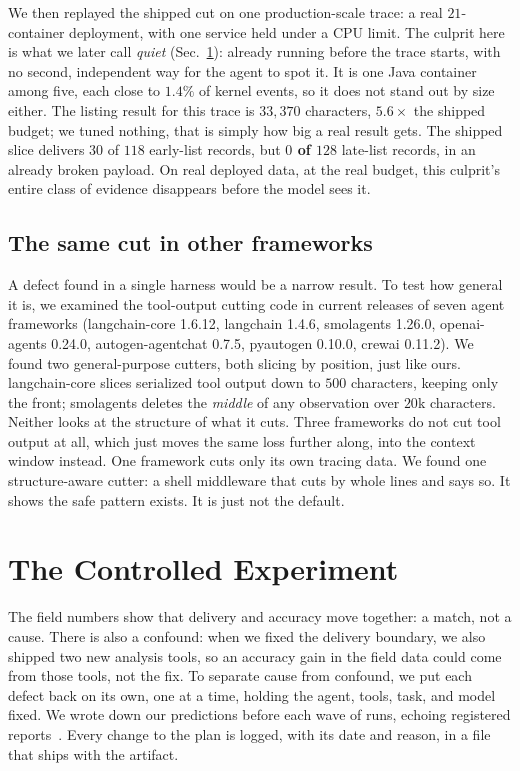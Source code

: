 \documentclass[10pt,conference]{IEEEtran}
\begin{document}
We then replayed the shipped cut on one production-scale trace: a real
$21$-container deployment, with one service held under a CPU limit. The
culprit here is what we later call \emph{quiet} (Sec.~\ref{sec:ablation}):
already running before the trace starts, with no second, independent way
for the agent to spot it. It is one Java container among five, each
close to $1.4\%$ of kernel events, so it does not stand out by size
either. The listing result for this trace is $33{,}370$ characters,
$5.6\times$ the shipped budget; we tuned nothing, that is simply how big
a real result gets. The shipped slice delivers $30$ of $118$ early-list
records, but \textbf{$0$ of $128$} late-list records, in an already
broken payload. On real deployed data, at the real budget, this
culprit's entire class of evidence disappears before the model sees it.

\subsection{The same cut in other frameworks}
A defect found in a single harness would be a narrow result. To test how
general it is, we examined the tool-output cutting code in current
releases of seven agent frameworks (langchain-core 1.6.12, langchain
1.4.6, smolagents 1.26.0,
openai-agents 0.24.0, autogen-agentchat 0.7.5, pyautogen 0.10.0, crewai
0.11.2). We found two general-purpose cutters, both slicing by position,
just like ours. langchain-core slices serialized tool output down to
$500$ characters, keeping only the front; smolagents deletes the
\emph{middle} of any observation over $20$k characters. Neither looks at
the structure of what it cuts. Three frameworks do not cut tool output
at all, which just moves the same loss further along, into the context
window instead. One framework cuts only its own tracing data. We found
one structure-aware cutter: a shell middleware that cuts by whole lines
and says so. It shows the safe pattern exists. It is just not the
default.

\section{The Controlled Experiment}
\label{sec:ablation}

The field numbers show that delivery and accuracy move together: a
match, not a cause. There is also a confound: when we fixed the delivery
boundary, we also shipped two new analysis tools, so an accuracy gain in
the field data could come from those tools, not the fix. To separate
cause from confound, we put each defect back on its own, one at a time,
holding the agent, tools, task, and model fixed. We wrote down our
predictions before each wave of runs, echoing registered
reports~\cite{ernst2023registered}. Every change to the plan is
logged, with its date and reason, in a file that ships with the
artifact.
\end{document}
